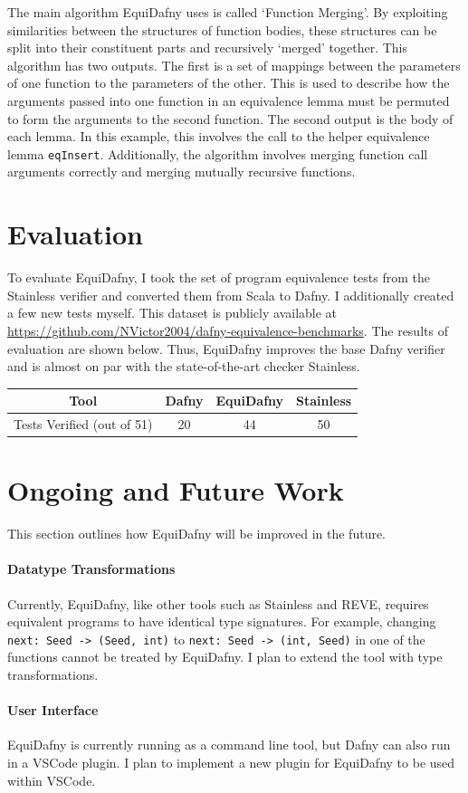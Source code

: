 \documentclass[runningheads]{llncs}
\begin{document}
The main algorithm EquiDafny uses is called `Function Merging'. By exploiting similarities between the structures of function bodies, these structures can be split into their constituent parts and recursively `merged' together.
This algorithm has two outputs. The first is a set of mappings between the parameters of one function to the parameters of the other. This is used to describe how the arguments passed into one function in an equivalence lemma must be permuted to form the arguments to the second function. 
The second output is the body of each lemma. In this example, this involves the call to the helper equivalence lemma \lstinline|eqInsert|. Additionally, the algorithm involves merging function call arguments correctly and merging mutually recursive functions.

\section{Evaluation}
To evaluate EquiDafny, I took the set of program equivalence tests from the Stainless verifier and converted them from Scala to Dafny. I additionally created a few new tests myself. This dataset is publicly available at \\\url{https://github.com/NVictor2004/dafny-equivalence-benchmarks}. The results of evaluation are shown below. Thus, EquiDafny improves the base Dafny verifier and is almost on par with the state-of-the-art checker Stainless. 
\begin{center}
  \begin{tabular}{|c|c|c|c|}
  \hline
  Tool & Dafny & EquiDafny & Stainless \\
  \hline
  Tests Verified (out of 51) & 20 & 44 & 50 \\
  \hline
  \end{tabular}
\end{center}

\section{Ongoing and Future Work}
This section outlines how EquiDafny will be improved in the future.

\paragraph{Datatype Transformations} Currently, EquiDafny, like other tools such as Stainless and REVE, requires equivalent programs to have identical type signatures. For example, changing \lstinline|next: Seed -> (Seed, int)| to \lstinline|next: Seed -> (int, Seed)| in one of the functions cannot be treated by EquiDafny. I plan to extend the tool with type transformations.

\paragraph{User Interface} EquiDafny is currently running as a command line tool, but Dafny can also run in a VSCode plugin. I plan to implement a new plugin for EquiDafny to be used within VSCode.



\end{document}
